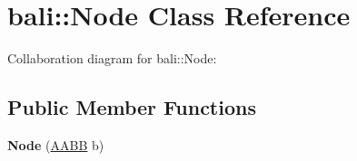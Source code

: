 \hypertarget{classbali_1_1_node}{\section{bali\-:\-:Node Class Reference}
\label{classbali_1_1_node}
}


Collaboration diagram for bali\-:\-:Node\-:
\subsection*{Public Member Functions}
\begin{DoxyCompactItemize}
\item 
\hypertarget{classbali_1_1_node_a25d084784ecceda9812642e696c95d8a}{{\bfseries Node} (\hyperlink{classbali_1_1_a_a_b_b}{A\-A\-B\-B} b)}\label{classbali_1_1_node_a25d084784ecceda9812642e696c95d8a}

\end{DoxyCompactItemize}
